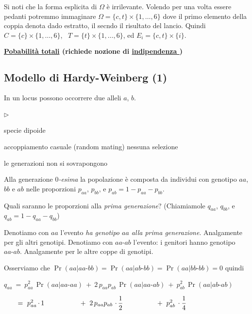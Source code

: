 \documentclass[11pt,openany]{book}
\newcommand{\mylabel}[1]{{\footnotesize\textsf{#1}}\hfill}
\newenvironment{citemize}
  {\begin{list}{$\triangleright$}{%
   \setlength{\parskip}{0mm}
   \setlength{\topsep}{.2\baselineskip}
   \setlength{\rightmargin}{0mm}
   \setlength{\listparindent}{0mm}
   \setlength{\itemindent}{0mm}
   \setlength{\labelwidth}{3ex}
   \setlength{\itemsep}{.1\baselineskip}
   \setlength{\parsep}{0mm}
   \setlength{\partopsep}{0mm}
   \setlength{\labelsep}{1ex}
   \setlength{\leftmargin}{\labelwidth+\labelsep}
   \let\makelabel\mylabel}}{%
   \end{list}\vspace*{-1.3mm}}
\begin{document}
Si noti che la forma esplicita di $\Omega$ \`e irrilevante.
Volendo per una volta essere pedanti potremmo immaginare $\Omega=\{c,t\}\times\{1,\dots,6\}$ dove il primo elemento della coppia denota dado estratto, il secndo il risultato del lancio.
Quindi $C=\{c\}\times\{1,\dots,6\}$, \ $T=\{t\}\times\{1,\dots,6\}$, ed $E_i=\{c,t\}\times\{i\}$.


\clearpage
\hfill\textbf{{\color{brown}\hyperref[TeoremaProbabilitaTotali]{Pobabilità totali} \faShare} (richiede nozione di \hyperref[indipendenza]{indipendenza \faShare})}

\subsection{Modello di Hardy-Weinberg (1)}
\label{HW_totali1}

In un locus possono occorrere due alleli $a$, $b$. 

\begin{citemize}
\item specie dipoide
\item accoppiamento casuale (random mating) nessuna selezione
\item le generazioni non si sovrapongono
\end{citemize}


Alla generazione \textit{$0$-esima\/} la popolazione è composta da individui con genotipo $aa$, $bb$ e $ab$ nelle proporzioni $p_{aa}$, $p_{bb}$, e  $p_{ab}=1-p_{aa}-p_{bb}$.

Quali saranno le proporzioni alla \textit{prima generazione}? (Chiamiamole $q_{aa}$, $q_{bb}$, e $q_{ab}=1-q_{aa}-q_{bb}$)

\def\-{\mbox{-}}

Denotiamo con $aa$ l'evento \textit{ha genotipo $aa$ alla prima generazione}. Analgamente per gli altri genotipi. Denotiamo con $aa\-ab$ l'evento: i genitori hanno genotipo $aa\mbox{-}ab$. Analgamente per le altre coppe di genotipi.

Osserviamo che $\Pr(aa | aa\-bb)=\Pr(aa | ab\-bb)=\Pr(aa | bb\-bb)=0$ quindi

$q_{aa}\ =\ %
p_{aa}^2\, \Pr(aa | aa\-aa)\ +\ 
2\,p_{aa}p_{ab}\, \Pr(aa | aa\-ab)\ +\ 
p^2_{ab}\, \Pr(aa | ab\-ab)$


$\phantom{q_{aa}}\ =\ %
p_{aa}^2\,\rlap{$\cdot\,1$}\phantom{\Pr(aa | aa,aa)}\ +\ 
2\,p_{aa}p_{ab}\, \rlap{$\,\cdot\,\dfrac12$}\ \phantom{\Pr(aa | aa\-ab)}\ +\ 
p^2_{ab}\, \cdot\dfrac14$ 
\end{document}
